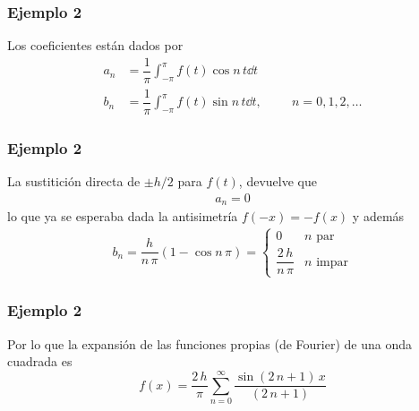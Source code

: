 \begin{frame}
\frametitle{Ejemplo 2}
Los coeficientes están dados por
\begin{align*}
a_{n} &= \dfrac{1}{\pi} \int_{-\pi}^{\pi} f(t) \cos n \, t \dd{t} \\[1em]
b_{n} &= \dfrac{1}{\pi} \int_{-\pi}^{\pi} f(t) \sin n \, t \dd{t}, \hspace{1cm} n = 0,1,2,\ldots
\end{align*}
\end{frame}
\begin{frame}
\frametitle{Ejemplo 2}
La sustitición directa de $\pm h/2$ para $f(t)$, devuelve que
\begin{align*}
 a_{n} = 0
\end{align*}
lo que ya se esperaba dada la antisimetría $f(-x) = - f(x)$ y además
\begin{align*}
b_{n} = \dfrac{h}{n \, \pi} (1 - \cos n \, \pi) = \begin{cases}
0 & n \mbox{ par} \\
\dfrac{2 \, h}{n \, \pi} & n \mbox{ impar} \end{cases}
\end{align*}
\end{frame}
\begin{frame}
\frametitle{Ejemplo 2}
Por lo que la expansión de las funciones propias (de Fourier) de una onda cuadrada es
\begin{equation}
f(x) = \dfrac{2 \, h}{\pi} \sum_{n=0}^{\infty} \dfrac{\sin(2 \, n + 1) \, x}{(2 \, n + 1)}
\label{eq:ecuacion_10_38}
\end{equation}
\end{frame}

